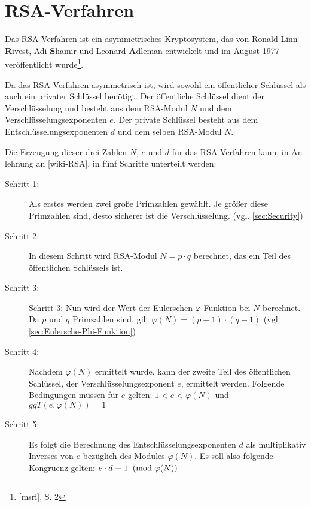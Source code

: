 \section{RSA-Verfahren}\label{sec:RSA-Verfahren}
Das RSA-Verfahren ist ein asymmetrisches Kryptosystem, das von
Ronald Linn \textbf{R}ivest, Adi \textbf{S}hamir und Leonard
\textbf{A}dleman entwickelt und im August 1977 veröffentlicht wurde\footnote{[msri], S. 2}.

Da das RSA-Verfahren asymmetrisch ist, wird sowohl ein öffentlicher
Schlüssel als auch ein privater Schlüssel benötigt. Der öffentliche
Schlüssel dient der Verschlüsselung und besteht aus dem RSA-Modul $N$
und dem Verschlüsselungsexponenten $e$. Der private Schlüssel
besteht aus dem Entschlüsselungsexponenten $d$ und dem selben RSA-Modul $N$.

Die Erzeugung dieser drei Zahlen $N$, $e$ und $d$ für das RSA-Verfahren
kann, in An-lehnung an [wiki-RSA], in fünf Schritte unterteilt werden:

\begin{description}
    \item[Schritt 1:] Als erstes werden zwei große Primzahlen  gewählt.
                      Je größer diese Primzahlen sind, desto sicherer
                      ist die Verschlüsselung.
                     (vgl. \cref{sec:Security})
    \item[Schritt 2:] In diesem Schritt wird RSA-Modul $N = p \cdot q$
                      berechnet, das ein Teil des öffentlichen
                      Schlüssels ist.
    \item[Schritt 3:] Schritt 3: Nun wird der Wert der Eulerschen
                      $\varphi$-Funktion bei $N$ berechnet. Da $p$
                      und $q$ Primzahlen sind, gilt $\varphi(N) = (p-1) \cdot (q-1)$ (vgl. \cref{sec:Eulersche-Phi-Funktion})
    \item[Schritt 4:] Nachdem $\varphi(N)$ ermittelt wurde, kann der
                      zweite Teil des öffentlichen Schlüssel, der
                      Verschlüsselungsexponent $e$, ermittelt werden.
                      Folgende Bedingungen müssen für $e$ gelten:
                      $1 < e < \varphi(N) $  und $ggT(e, \varphi(N)) = 1$
    \item[Schritt 5:] Es folgt die Berechnung des Entschlüsselungsexponenten
                      $d$ als multiplikativ Inverses von $e$
                      bezüglich des Modules $\varphi(N)$. Es soll
                      also folgende Kongruenz gelten:
                      $e \cdot d \equiv 1 \imod{\varphi(N)}$

\end{description}


